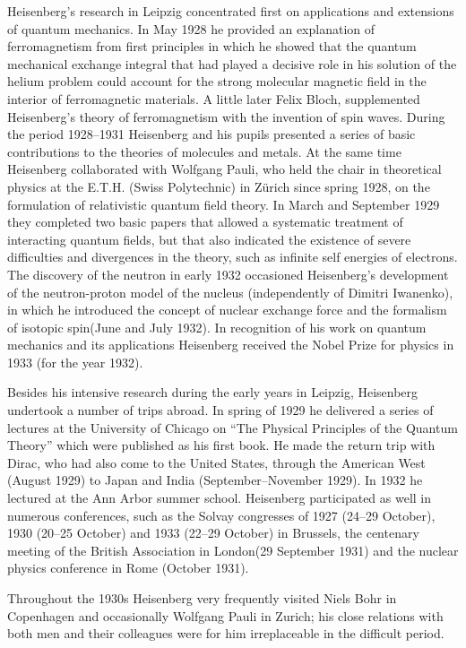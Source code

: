 \documentclass{article}
\begin{document}
Heisenberg's research in Leipzig concentrated first on applications and extensions of quantum mechanics. In May 1928 he provided an explanation of ferromagnetism from first principles in which he showed that the quantum mechanical exchange integral that had played a decisive role in his solution of the helium problem could account for the strong molecular magnetic field in the interior of ferromagnetic materials. A little later Felix Bloch, supplemented Heisenberg's theory of ferromagnetism with the invention of spin waves. During the period 1928--1931 Heisenberg and his pupils presented a series of basic contributions to the theories of molecules and metals. At the same time Heisenberg collaborated with Wolfgang Pauli, who held the chair in theoretical physics at the E.T.H. (Swiss Polytechnic) in  Zürich since spring 1928, on the formulation of relativistic quantum field theory. In March and September 1929 they completed two basic papers that allowed a systematic treatment of interacting quantum fields, but that also indicated the existence of severe difficulties and divergences in the theory, such as infinite self energies of electrons. The discovery of the neutron in early 1932 occasioned Heisenberg's development of the neutron-proton model of the nucleus (independently of Dimitri Iwanenko), in which he introduced the concept of nuclear exchange force and the formalism of isotopic spin(June and July 1932). In recognition of his work on quantum mechanics and its applications Heisenberg received the Nobel Prize for physics in 1933 (for the year 1932).

Besides his intensive research during the early years in Leipzig, Heisenberg undertook a number of trips abroad. In spring of 1929 he delivered a series of lectures at the University of Chicago on “The Physical Principles of the Quantum Theory” which were published as his first book. He made the return trip with Dirac, who had also come to the United States, through the American West (August 1929) to Japan and India (September--November 1929). In 1932 he lectured at the Ann Arbor summer school. Heisenberg participated as well in numerous conferences, such as the Solvay congresses of 1927 (24--29 October), 1930 (20--25 October) and 1933 (22--29 October) in Brussels, the centenary meeting of the British Association in London(29 September 1931) and the nuclear physics conference in Rome (October 1931).

Throughout the 1930s Heisenberg very frequently visited Niels Bohr in Copenhagen and occasionally Wolfgang Pauli in Zurich; his close relations with both men and their colleagues were for him irreplaceable in the difficult period.
\end{document}
